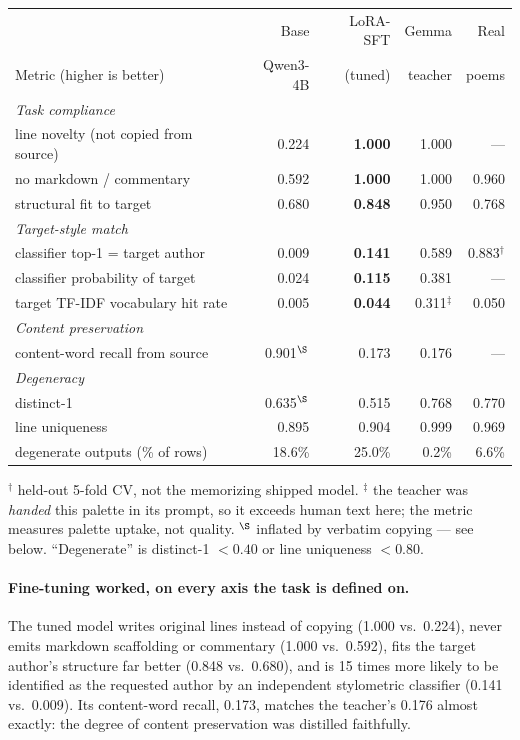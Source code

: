 \documentclass[11pt]{article}
\begin{document}
\begin{center}
\begin{tabular}{lrrrr}
\toprule
& Base & LoRA-SFT & Gemma & Real \\
Metric (higher is better) & Qwen3-4B & (tuned) & teacher & poems \\
\midrule
\multicolumn{5}{l}{\emph{Task compliance}} \\
\quad line novelty (not copied from source) & 0.224 & \textbf{1.000} & 1.000 & --- \\
\quad no markdown / commentary             & 0.592 & \textbf{1.000} & 1.000 & 0.960 \\
\quad structural fit to target             & 0.680 & \textbf{0.848} & 0.950 & 0.768 \\
\midrule
\multicolumn{5}{l}{\emph{Target-style match}} \\
\quad classifier top-1 = target author     & 0.009 & \textbf{0.141} & 0.589 & 0.883$^\dagger$ \\
\quad classifier probability of target     & 0.024 & \textbf{0.115} & 0.381 & --- \\
\quad target TF-IDF vocabulary hit rate    & 0.005 & \textbf{0.044} & 0.311$^\ddagger$ & 0.050 \\
\midrule
\multicolumn{5}{l}{\emph{Content preservation}} \\
\quad content-word recall from source      & 0.901$^\S$ & 0.173 & 0.176 & --- \\
\midrule
\multicolumn{5}{l}{\emph{Degeneracy}} \\
\quad distinct-1                           & 0.635$^\S$ & 0.515 & 0.768 & 0.770 \\
\quad line uniqueness                      & 0.895 & 0.904 & 0.999 & 0.969 \\
\quad degenerate outputs (\% of rows)      & 18.6\% & 25.0\% & 0.2\% & 6.6\% \\
\bottomrule
\end{tabular}
\end{center}

\noindent
{\footnotesize $^\dagger$ held-out 5-fold CV, not the memorizing shipped
model. $^\ddagger$ the teacher was \emph{handed} this palette in its prompt,
so it exceeds human text here; the metric measures palette uptake, not
quality. $^\S$ inflated by verbatim copying --- see below. ``Degenerate'' is
distinct-1 $< 0.40$ or line uniqueness $< 0.80$.}

\paragraph{Fine-tuning worked, on every axis the task is defined on.} The
tuned model writes original lines instead of copying (1.000 vs.\ 0.224),
never emits markdown scaffolding or commentary (1.000 vs.\ 0.592), fits the
target author's structure far better (0.848 vs.\ 0.680), and is 15 times more
likely to be identified as the requested author by an independent stylometric
classifier (0.141 vs.\ 0.009). Its content-word recall, 0.173, matches the
teacher's 0.176 almost exactly: the degree of content preservation was
distilled faithfully.
\end{document}
